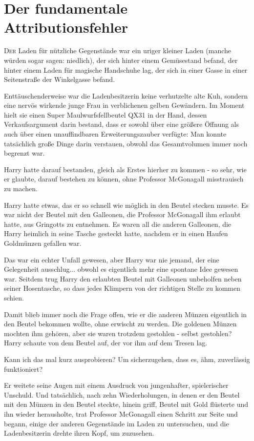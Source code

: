 \chapter{Der fundamentale Attributionsfehler}

\lettrine{D}{er} Laden für nützliche Gegenstände war ein uriger kleiner Laden
(manche würden sogar sagen: niedlich), der sich hinter einem Gemüsestand befand,
der hinter einem Laden für magische Handschuhe lag, der sich in einer Gasse in
einer Seitenstraße der Winkelgasse befand.

Enttäuschenderweise war die Ladenbesitzerin keine verhutzelte alte Kuh, sondern
eine nervös wirkende junge Frau in verblichenen gelben Gewändern. Im Moment
hielt sie einen Super Maulwurfsfellbeutel QX31 in der Hand, dessen
Verkaufsargument darin bestand, dass er sowohl über eine größere Öffnung als
auch über einen unauffindbaren Erweiterungszauber verfügte: Man konnte
tatsächlich große Dinge darin verstauen, obwohl das Gesamtvolumen immer noch
begrenzt war.

Harry hatte darauf bestanden, gleich als Erstes hierher zu kommen - so sehr, wie
er glaubte, darauf bestehen zu können, ohne Professor McGonagall misstrauisch zu
machen.

Harry hatte etwas, das er so schnell wie möglich in den Beutel stecken musste.
Es war nicht der Beutel mit den Galleonen, die Professor McGonagall ihm erlaubt
hatte, aus Gringotts zu entnehmen. Es waren all die anderen Galleonen, die Harry
heimlich in seine Tasche gesteckt hatte, nachdem er in einen Haufen Goldmünzen
gefallen war.

Das war ein echter Unfall gewesen, aber Harry war nie jemand, der eine
Gelegenheit ausschlug... obwohl es eigentlich mehr eine spontane Idee gewesen
war. Seitdem trug Harry den erlaubten Beutel mit Galleonen unbeholfen neben
seiner Hosentasche, so dass jedes Klimpern von der richtigen Stelle zu kommen
schien.

Damit blieb immer noch die Frage offen, wie er die anderen Münzen eigentlich in
den Beutel bekommen wollte, ohne erwischt zu werden. Die goldenen Münzen mochten
ihm gehören, aber sie waren trotzdem gestohlen - selbst gestohlen? Harry schaute
von dem Beutel auf, der vor ihm auf dem Tresen lag.

\glqq{}Kann ich das mal kurz ausprobieren? Um sicherzugehen, dass es, ähm,
zuverlässig funktioniert?\grqq{}

Er weitete seine Augen mit einem Ausdruck von jungenhafter, spielerischer
Unschuld. Und tatsächlich, nach zehn Wiederholungen, in denen er den Beutel mit
den Münzen in den Beutel steckte, hinein griff, \glqq{}Beutel mit Gold\grqq{}
flüsterte und ihn wieder herausholte, trat Professor McGonagall einen Schritt
zur Seite und begann, einige der anderen Gegenstände im Laden zu untersuchen,
und die Ladenbesitzerin drehte ihren Kopf, um zuzusehen.

